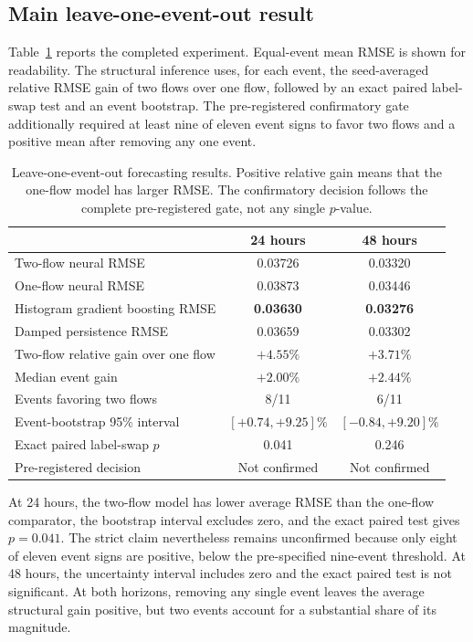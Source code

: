\subsection{Main leave-one-event-out result}

Table~\ref{tab:main} reports the completed experiment. Equal-event mean RMSE is shown for readability. The structural inference uses, for each event, the seed-averaged relative RMSE gain of two flows over one flow, followed by an exact paired label-swap test and an event bootstrap. The pre-registered confirmatory gate additionally required at least nine of eleven event signs to favor two flows and a positive mean after removing any one event.

\begin{table}[t]
\centering
\caption{Leave-one-event-out forecasting results. Positive relative gain means that the one-flow model has larger RMSE. The confirmatory decision follows the complete pre-registered gate, not any single $p$-value.}
\label{tab:main}
\small
\begin{tabular}{@{}lcc@{}}
\toprule
& 24 hours & 48 hours\\
\midrule
Two-flow neural RMSE & 0.03726 & 0.03320\\
One-flow neural RMSE & 0.03873 & 0.03446\\
Histogram gradient boosting RMSE & \textbf{0.03630} & \textbf{0.03276}\\
Damped persistence RMSE & 0.03659 & 0.03302\\
\midrule
Two-flow relative gain over one flow & $+4.55\%$ & $+3.71\%$\\
Median event gain & $+2.00\%$ & $+2.44\%$\\
Events favoring two flows & 8/11 & 6/11\\
Event-bootstrap 95\% interval & $[+0.74,+9.25]\%$ & $[-0.84,+9.20]\%$\\
Exact paired label-swap $p$ & 0.041 & 0.246\\
Pre-registered decision & Not confirmed & Not confirmed\\
\bottomrule
\end{tabular}
\end{table}

At 24 hours, the two-flow model has lower average RMSE than the one-flow comparator, the bootstrap interval excludes zero, and the exact paired test gives $p=0.041$. The strict claim nevertheless remains unconfirmed because only eight of eleven event signs are positive, below the pre-specified nine-event threshold. At 48 hours, the uncertainty interval includes zero and the exact paired test is not significant. At both horizons, removing any single event leaves the average structural gain positive, but two events account for a substantial share of its magnitude.

